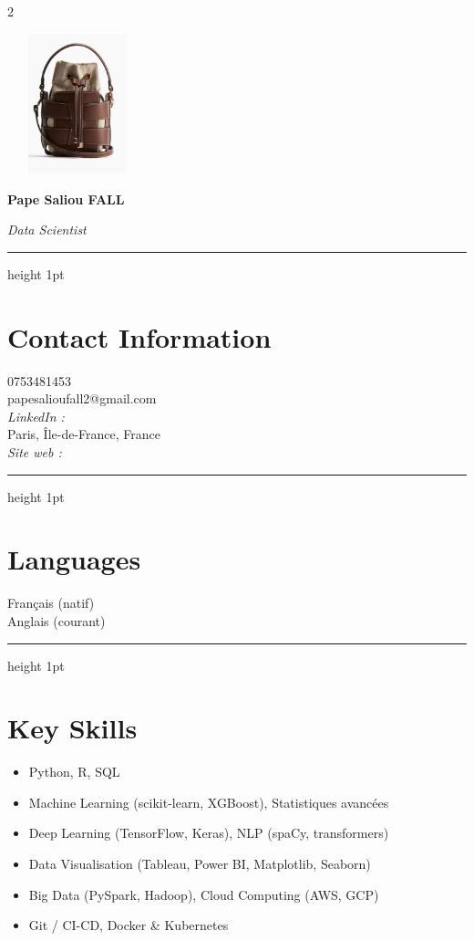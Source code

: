\documentclass[10pt,letterpaper]{article}
\newcommand{\cvName}[1]{\vspace*{0.3in}\textbf{\LARGE #1}}
\newcommand{\cvHeadline}[1]{\par\smallskip\textit{#1}}
\newcommand{\cvHr}{\vspace{0.5\baselineskip}\hrule height 1pt\color{primary}\vspace{0.7\baselineskip}}
\begin{document}
\small
\begin{paracol}{2}

\begin{leftcolumn}
\begin{center}
\includegraphics[width=1.6in,height=1.6in,keepaspectratio]{ea981acc637847edbc104f1e9916bac5.png}
\end{center}

\vspace{0.6in}

\cvName{Pape Saliou FALL}
\cvHeadline{Data Scientist}
\cvHr

\section*{Contact Information}
0753481453\\
papesalioufall2@gmail.com\\
\textit{LinkedIn :}\,\\ %
Paris, Île-de-France, France\\
\textit{Site web :}\,

\cvHr
\section*{Languages}
Français (natif)\\
Anglais (courant)

\cvHr
\section*{Key Skills}
\begin{itemize}
  \item Python, R, SQL
  \item Machine Learning (scikit-learn, XGBoost), Statistiques avancées
  \item Deep Learning (TensorFlow, Keras), NLP (spaCy, transformers)
  \item Data Visualisation (Tableau, Power BI, Matplotlib, Seaborn)
  \item Big Data (PySpark, Hadoop), Cloud Computing (AWS, GCP)
  \item Git / CI-CD, Docker \& Kubernetes
\end{itemize}


\end{leftcolumn}
\end{paracol}
\end{document}
